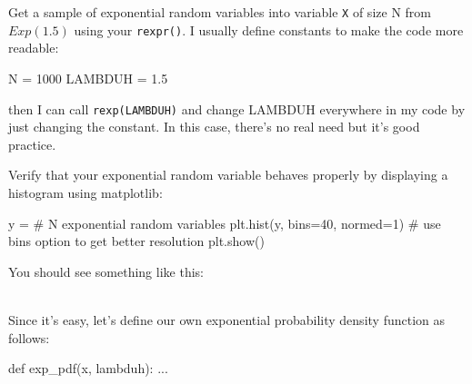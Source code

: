 \begin{fullwidth}
\step Get a sample of exponential random variables into variable {\tt X} of size N from $Exp(1.5)$ using your {\tt rexpr()}. I usually define constants to make the code more readable:

\begin{pyverbatim}
N = 1000
LAMBDUH = 1.5
\end{pyverbatim}

\noindent then I can call {\tt rexp(LAMBDUH)} and change LAMBDUH everywhere in my code by just changing the constant. In this case, there's no real need but it's good practice.

\step Verify that your exponential random variable behaves properly by displaying a histogram using matplotlib:

\begin{pyverbatim}
y = # N exponential random variables
plt.hist(y, bins=40, normed=1) # use bins option to get better resolution
plt.show()
\end{pyverbatim}

\noindent You should see something like this:


\\

\step Since it's easy, let's define our own exponential probability density function as follows:

\begin{pyverbatim}
def exp_pdf(x, lambduh):
    ...
\end{pyverbatim}


\end{fullwidth}
